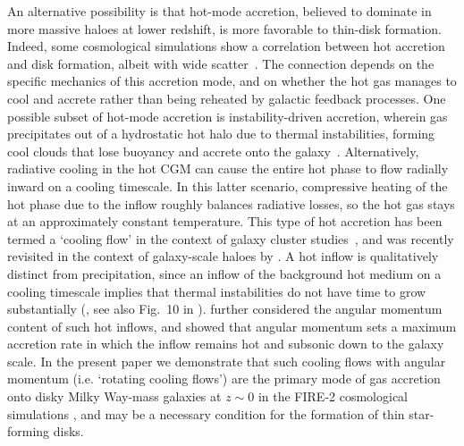 \documentclass[fleqn,usenatbib]{mnras}
\begin{document}
An alternative possibility is that hot-mode accretion, believed to dominate in more massive haloes at lower redshift, is more favorable to thin-disk formation.
Indeed, some cosmological simulations show a correlation between hot accretion and disk formation, albeit with wide scatter~\citep{Sales2012}.
The connection depends on the specific mechanics of this accretion mode, and on whether the hot gas manages to cool and accrete rather than being reheated by galactic feedback processes.
One possible subset of hot-mode accretion is instability-driven accretion, wherein gas precipitates out of a hydrostatic hot halo due to thermal instabilities, forming cool clouds that lose buoyancy and accrete onto the galaxy~\citep[e.g.][]{FallRees85, Maller2004, Mccourt2012, Voit2015, Armillotta2016, Gronke2020b,Fielding2020, Voit2021}.
Alternatively, radiative cooling in the hot CGM can cause the entire hot phase to flow radially inward on a cooling timescale. 
In this latter scenario, compressive heating of the hot phase due to the inflow roughly balances radiative losses, so the hot gas stays at an approximately constant temperature.
This type of hot accretion has been termed a `cooling flow' in the context of galaxy cluster studies~\citep[][see \citealt{McNamara2007} for a review]{Mathews1978, Cowie1980, Fabian1984, Balbus1988, Bertschinger1989}, and was recently revisited in the context of galaxy-scale haloes by \cite{Stern2019}.
A hot inflow is qualitatively distinct from precipitation, since an inflow of the background hot medium on a cooling timescale implies that thermal instabilities do not have time to grow substantially (\citealt{Balbus1989}, see also Fig.~10 in \citealt{ Stern2019}).
\cite{Stern2020} further considered the angular momentum content of such hot inflows, and showed that angular momentum sets a maximum accretion rate in which the inflow remains hot and subsonic down to the galaxy scale. 
In the present paper we demonstrate that such cooling flows with angular momentum (i.e. `rotating cooling flows')
are the primary mode of gas accretion onto disky Milky Way-mass galaxies at $z \sim 0$ in the FIRE-2 cosmological simulations \citep{Hopkins2018}, and may be a necessary condition for the formation of thin star-forming disks.
\end{document}
